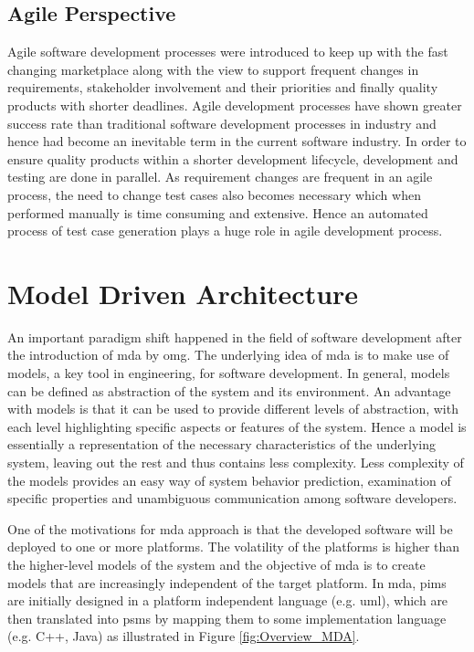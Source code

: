  
\subsection{Agile Perspective}
Agile software development processes \cite{ambler2009agile} were introduced to keep up with the fast changing marketplace along with the view to support frequent changes in requirements, stakeholder involvement and their priorities and finally quality products with shorter deadlines. Agile development processes have shown greater success rate than traditional software development processes in industry and hence had become an inevitable term in the current software industry. In order to ensure quality products within a shorter development lifecycle, development and testing are done in parallel. As requirement changes are frequent in an agile process, the need to change test cases also becomes necessary which when performed manually is time consuming and extensive. Hence an automated process of test case generation plays a huge role in agile development process.

\section{Model Driven Architecture}
An important paradigm shift happened in the field of software development after the introduction of \gls{mda} by \gls{omg}.   The underlying idea of \gls{mda} is to make use of models, a key tool in engineering, for software development. In general, models can be defined as abstraction of the system and its environment. An advantage with models is that it can be used to provide different levels of abstraction, with each level highlighting specific aspects or features of the system. Hence a model is essentially a representation of the necessary characteristics of the underlying system, leaving out the rest and thus contains less complexity. Less complexity of the models provides an easy way of system behavior prediction, examination of specific properties and unambiguous communication among software developers.

One of the motivations for \gls{mda} approach is that the developed software will be deployed to one or more platforms. The volatility of the platforms is higher than the higher-level models of the system and the objective of \gls{mda} is to create models that are increasingly independent of the target platform. In \gls{mda}, \glspl{pim} are initially designed in a platform independent language (e.g. \gls{uml}), which are then translated into \glspl{psm} by mapping them to some implementation language (e.g. C++, Java) as illustrated in Figure \ref{fig:Overview_MDA}.

